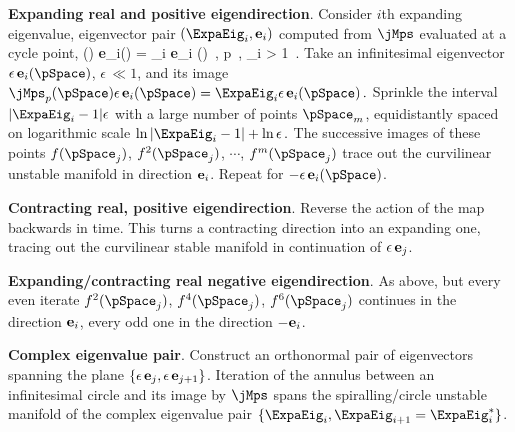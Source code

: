 {\bf Expanding real and positive eigendirection}.
%
Consider $i$th expanding eigenvalue, eigenvector pair
$(\ExpaEig_{i},{\bf e}_i)$
computed from $\jMps$ evaluated at a cycle point,
\beq
\jMps (\pSpace) {\bf e}_i(\pSpace) =
    \ExpaEig_{i} {\bf e}_i (\pSpace)
    \,,  \quad
\pSpace \in p
    \,,  \quad \ExpaEig_{i} > 1
\,.
Take an infinitesimal eigenvector
$\epsilon\, {\bf e}_i (\pSpace)$,
$\epsilon\, \ll 1$, and its image
$
\jMps_p (\pSpace) \epsilon\,{\bf e}_i(\pSpace) =
        \ExpaEig_{i}\epsilon\, {\bf e}_i (\pSpace)
\,.
$
Sprinkle the interval
$
|\ExpaEig_{i} -1| \epsilon
$
with a large number of points $\pSpace_m$, equidistantly spaced
on logarithmic scale
$
\ln|\ExpaEig_{i} -1| + \ln\epsilon
\,.
$
The successive images of these points
$f(\pSpace_j)$,
$f^2(\pSpace_j)$,
$\cdots$,
$f^m(\pSpace_j)$ trace out the curvilinear unstable manifold in direction
${\bf e}_i$. Repeat for $-\epsilon\, {\bf e}_i (\pSpace)$.


{\bf Contracting real, positive eigendirection}. Reverse the
action of the map backwards in time. This turns a contracting
direction into an expanding one, tracing out the curvilinear
stable manifold in continuation of $\epsilon\, {\bf e}_j$.

{\bf Expanding/contracting  real negative eigendirection}. As above, but
every even iterate
$f^2(\pSpace_j)$,
$f^4(\pSpace_j)$,
$f^6(\pSpace_j)$ continues in the direction ${\bf e}_i$, every odd one
in the direction $-{\bf e}_i$.

{\bf Complex eigenvalue pair}. Construct an orthonormal
pair of eigenvectors spanning
the plane $\{ \epsilon\, {\bf e}_j,\epsilon\, {\bf e}_{j+1} \}$.
Iteration of the annulus
between an infinitesimal circle and its image by $\jMps$ spans
the spiralling/circle unstable manifold of the complex eigenvalue
pair $\{\ExpaEig_{i}, \ExpaEig_{i+1} = \ExpaEig_{i}^* \}$.

    \PublicPrivate{
    }{ %
Alternatively, one can write
down a parametric equation for the stable (unstable) manifold and
generate the manifold by integrating the equation. %
\PC{explain, draw figure}
    } %

